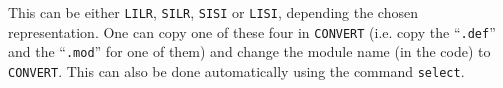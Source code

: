 
This can be either {\tt LILR}, {\tt SILR}, {\tt SISI} or {\tt LISI},
depending the chosen representation.
One can copy one of these four in {\tt CONVERT} (i.e. copy the
``{\tt .def}'' and the ``{\tt .mod}'' for one of them)
and change the module name (in the code) to {\tt CONVERT}.
This can also be done automatically using the command {\tt select}.
